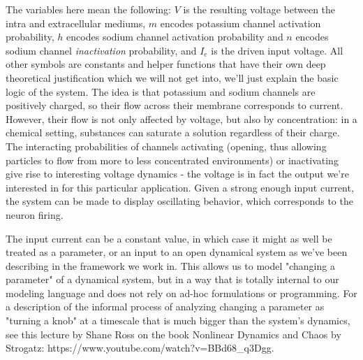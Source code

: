 The variables here mean the following: $V$ is the resulting voltage between the intra and extracellular mediums, $m$ encodes potassium channel activation probability, $h$ encodes sodium channel activation probability and $n$ encodes sodium channel \textit{inactivation} probability, and $I_e$ is the driven input voltage. All other symbols are constants and helper functions that have their own deep theoretical justification which we will not get into, we'll just explain the basic logic of the system. The idea is that potassium and sodium channels are positively charged, so their flow across their membrane corresponds to current. However, their flow is not only affected by voltage, but also by concentration: in a chemical setting, substances can saturate a solution regardless of their charge. The interacting probabilities of channels activating (opening, thus allowing particles to flow from more to less concentrated environments) or inactivating give rise to interesting voltage dynamics - the voltage is in fact the output we're interested in for this particular application. Given a strong enough input current, the system can be made to display oscillating behavior, which corresponds to the neuron firing.

The input current can be a constant value, in which case it might as well be treated as a parameter, or an input to an open dynamical system as we've been describing in the framework we work in. This allows us to model "changing a parameter" of a dynamical system, but in a way that is totally internal to our modeling language and does not rely on ad-hoc formulations or programming. For a description of the informal process of analyzing changing a parameter as "turning a knob" at a timescale that is much bigger than the system's dynamics, see this lecture by Shane Ross on the book Nonlinear Dynamics and Chaos by Strogatz: https://www.youtube.com/watch?v=BBd68\_q3Dgg.

